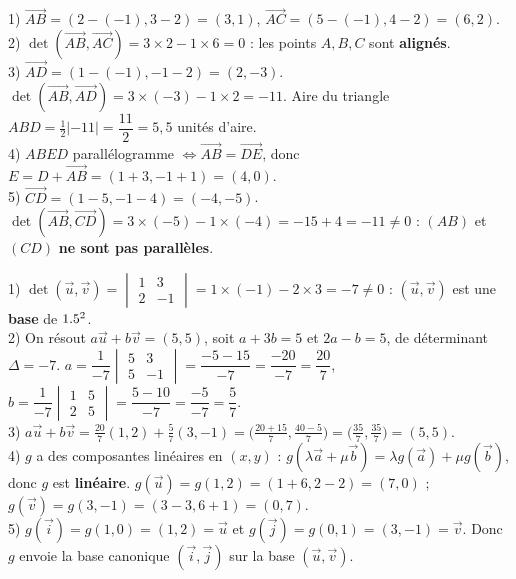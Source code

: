 1) $\vec{AB}=(2-(-1),3-2)=(3,1)$, $\vec{AC}=(5-(-1),4-2)=(6,2)$.\\
2) $\det(\vec{AB},\vec{AC})=3\times2-1\times6=0$ : les points $A,B,C$ sont \textbf{alignés}.\\
3) $\vec{AD}=(1-(-1),-1-2)=(2,-3)$. $\det(\vec{AB},\vec{AD})=3\times(-3)-1\times2=-11$. Aire du
triangle $ABD=\tfrac12|{-11}|=\dfrac{11}{2}=5{,}5$ unités d'aire.\\
4) $ABED$ parallélogramme $\Leftrightarrow\vec{AB}=\vec{DE}$, donc $E=D+\vec{AB}=(1+3,-1+1)=(4,0)$.\\
5) $\vec{CD}=(1-5,-1-4)=(-4,-5)$. $\det(\vec{AB},\vec{CD})=3\times(-5)-1\times(-4)=-15+4=-11\neq0$ :
$(AB)$ et $(CD)$ \textbf{ne sont pas parallèles}.

1) $\det(\vec u,\vec v)=\begin{vmatrix}1&3\\2&-1\end{vmatrix}=1\times(-1)-2\times3=-7\neq0$ :
$(\vec u,\vec v)$ est une \textbf{base} de $1.5^2$.\\
2) On résout $a\vec u+b\vec v=(5,5)$, soit $a+3b=5$ et $2a-b=5$, de déterminant $\Delta=-7$.
$a=\dfrac{1}{-7}\begin{vmatrix}5&3\\5&-1\end{vmatrix}=\dfrac{-5-15}{-7}=\dfrac{-20}{-7}=\dfrac{20}{7}$,\;
$b=\dfrac{1}{-7}\begin{vmatrix}1&5\\2&5\end{vmatrix}=\dfrac{5-10}{-7}=\dfrac{-5}{-7}=\dfrac{5}{7}$.\\
3) $a\vec u+b\vec v=\tfrac{20}{7}(1,2)+\tfrac57(3,-1)=\big(\tfrac{20+15}{7},\tfrac{40-5}{7}\big)
=\big(\tfrac{35}{7},\tfrac{35}{7}\big)=(5,5)$. \checkmark\\
4) $g$ a des composantes linéaires en $(x,y)$ : $g(\lambda\vec a+\mu\vec b)=\lambda g(\vec a)+\mu g(\vec b)$,
donc $g$ est \textbf{linéaire}. $g(\vec u)=g(1,2)=(1+6,2-2)=(7,0)$ ;
$g(\vec v)=g(3,-1)=(3-3,6+1)=(0,7)$.\\
5) $g(\vec i)=g(1,0)=(1,2)=\vec u$ et $g(\vec j)=g(0,1)=(3,-1)=\vec v$. Donc $g$ envoie la base
canonique $(\vec i,\vec j)$ sur la base $(\vec u,\vec v)$.

